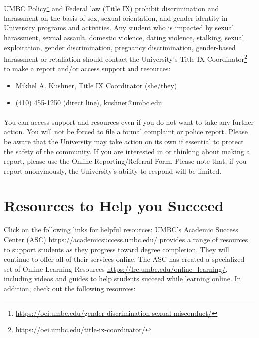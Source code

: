 \documentclass[letter,10pt]{article}
\begin{document}
\paragraph{}UMBC Policy\footnote{\url{https://oei.umbc.edu/gender-discrimination-sexual-misconduct/}} and Federal law (Title IX) prohibit discrimination and harassment on the basis of sex, sexual orientation, and gender identity in University programs and activities. Any student who is impacted by sexual harassment, sexual assault, domestic violence, dating violence, stalking, sexual exploitation, gender discrimination, pregnancy discrimination, gender-based harassment or retaliation should contact the University’s Title IX Coordinator\footnote{\url{https://oei.umbc.edu/title-ix-coordinator/}} to make a report and/or access support and resources:
\begin{itemize}
\item Mikhel A. Kushner, Title IX Coordinator (she/they)
\item \href{tel:+14104551250}{(410) 455-1250} (direct line), \href{mailto:kushner@umbc.edu?Subject=Title\%20IX}{kushner@umbc.edu}
\end{itemize}

\paragraph{}You can access support and resources even if you do not want to take any further action. You will not be forced to file a formal complaint or police report. Please be aware that the University may take action on its own if essential to protect the safety of the community. If you are interested in or thinking about making a report, please use the Online Reporting/Referral Form. Please note that, if you report anonymously,  the University’s ability to respond will be limited.

\section*{Resources to Help you Succeed}
\paragraph{}Click on the following links for helpful resources:
UMBC’s Academic Success Center (ASC) \url{https://academicsuccess.umbc.edu/} provides a range of resources to support students as they progress toward degree completion. They will continue to offer all of their services online. 
The ASC has created a specialized set of Online Learning Resources \url{https://lrc.umbc.edu/online_learning/}, including videos and guides to help students succeed while learning online.
In addition, check out the following resources:
\end{document}
